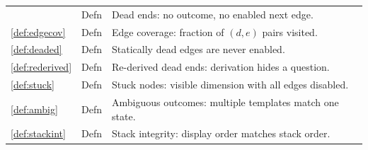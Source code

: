 \documentclass[11pt]{article}
\theoremstyle{definition}
\begin{document}
\begin{center}
\begin{tabular}{llp{7.5cm}}
  & Defn
  & Dead ends: no outcome, no enabled next edge. \\
\ref{def:edgecov}
  & Defn
  & Edge coverage: fraction of $(d,e)$ pairs visited. \\
\ref{def:deaded}
  & Defn
  & Statically dead edges are never enabled. \\
\ref{def:rederived}
  & Defn
  & Re-derived dead ends: derivation hides a question. \\
\ref{def:stuck}
  & Defn
  & Stuck nodes: visible dimension with all edges disabled. \\
\ref{def:ambig}
  & Defn
  & Ambiguous outcomes: multiple templates match one state. \\
\ref{def:stackint}
  & Defn
  & Stack integrity: display order matches stack order. \\
\end{tabular}
\end{center}
\end{document}
